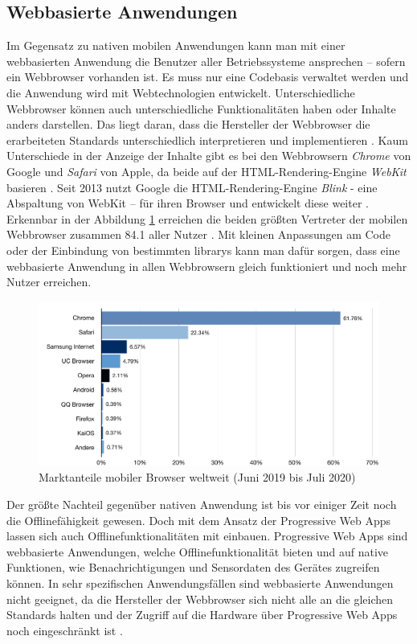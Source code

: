 \subsection{Webbasierte Anwendungen}
Im Gegensatz zu nativen mobilen Anwendungen kann man mit einer webbasierten Anwendung die Benutzer aller Betriebssysteme ansprechen – sofern ein Webbrowser vorhanden ist.
Es muss nur eine Codebasis verwaltet werden und die Anwendung wird mit Webtechnologien entwickelt.
Unterschiedliche Webbrowser können auch unterschiedliche Funktionalitäten haben oder Inhalte anders darstellen.
Das liegt daran, dass die Hersteller der Webbrowser die erarbeiteten Standards unterschiedlich interpretieren und implementieren \parencite{RED2016}.
Kaum Unterschiede in der Anzeige der Inhalte gibt es bei den Webbrowsern \textit{Chrome} von Google und \textit{Safari} von Apple, da beide auf der HTML-Rendering-Engine \textit{WebKit} basieren \parencite{PIC2008}.
Seit 2013 nutzt Google die HTML-Rendering-Engine \textit{Blink} - eine Abspaltung von WebKit – für ihren Browser und entwickelt diese weiter \parencite{BAR2013}.
Erkennbar in der Abbildung \ref{fig:browser-market-share} erreichen die beiden größten Vertreter der mobilen Webbrowser zusammen \SI{84.1}{\prc} aller Nutzer \parencite{STA2020}.
Mit kleinen Anpassungen am Code oder der Einbindung von bestimmten \Glspl{library} kann man dafür sorgen, dass eine webbasierte Anwendung in allen Webbrowsern gleich funktioniert und noch mehr Nutzer erreichen.
\begin{figure}[h!]
	\includegraphics[scale=0.65]{images/browser-market-share}
	\caption{Marktanteile mobiler Browser weltweit (Juni 2019 bis Juli 2020)}
	\label{fig:browser-market-share}
\end{figure}
Der größte Nachteil gegenüber nativen Anwendung ist bis vor einiger Zeit noch die Offlinefähigkeit gewesen.
Doch mit dem Ansatz der Progressive Web Apps lassen sich auch Offlinefunktionalitäten mit einbauen.
Progressive Web Apps sind webbasierte Anwendungen, welche Offlinefunktionalität bieten und auf native Funktionen, wie Benachrichtigungen und Sensordaten des Gerätes zugreifen können.
In sehr spezifischen Anwendungsfällen sind webbasierte Anwendungen nicht geeignet, da die Hersteller der Webbrowser sich nicht alle an die gleichen Standards halten und der Zugriff auf die Hardware über Progressive Web Apps noch eingeschränkt ist \parencite{TOR2020}.

